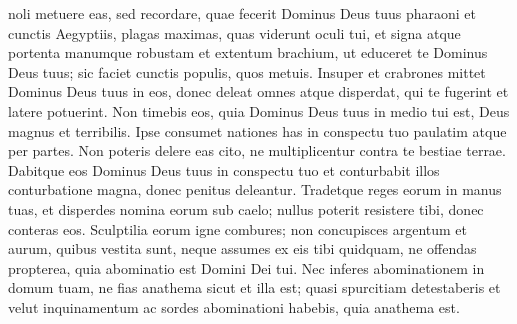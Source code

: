 \begin{biblechapter}
\verse noli metuere eas, sed recordare, quae fecerit Dominus Deus tuus pharaoni et cunctis Aegyptiis, 
\verse plagas maximas, quas viderunt oculi tui, et signa atque portenta manumque robustam et extentum brachium, ut educeret te Dominus Deus tuus; sic faciet cunctis populis, quos metuis. 
\verse Insuper et crabrones mittet Dominus Deus tuus in eos, donec deleat omnes atque disperdat, qui te fugerint et latere potuerint. 
\verse Non timebis eos, quia Dominus Deus tuus in medio tui est, Deus magnus et terribilis. 
\verse Ipse consumet nationes has in conspectu tuo paulatim atque per partes. Non poteris delere eas cito, ne multiplicentur contra te bestiae terrae. 
\verse Dabitque eos Dominus Deus tuus in conspectu tuo et conturbabit illos conturbatione magna, donec penitus deleantur. 
\verse Tradetque reges eorum in manus tuas, et disperdes nomina eorum sub caelo; nullus poterit resistere tibi, donec conteras eos. 
\verse Sculptilia eorum igne combures; non concupisces argentum et aurum, quibus vestita sunt, neque assumes ex eis tibi quidquam, ne offendas propterea, quia abominatio est Domini Dei tui. 
\verse Nec inferes abominationem in domum tuam, ne fias anathema sicut et illa est; quasi spurcitiam detestaberis et velut inquinamentum ac sordes abominationi habebis, quia anathema est. 
\end{biblechapter}

